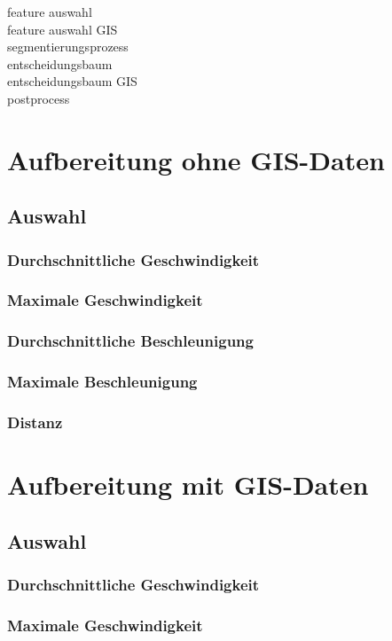 feature auswahl \\
feature auswahl GIS \\
segmentierungsprozess \\
entscheidungsbaum \\
entscheidungsbaum GIS \\
postprocess \\
\clearpage


\section{Aufbereitung ohne GIS-Daten}
\subsection{Auswahl}
\subsubsection{Durchschnittliche Geschwindigkeit}
\subsubsection{Maximale Geschwindigkeit}
\subsubsection{Durchschnittliche Beschleunigung}
\subsubsection{Maximale Beschleunigung}
\subsubsection{Distanz}
\clearpage

\section{Aufbereitung mit GIS-Daten}
\subsection{Auswahl}
\subsubsection{Durchschnittliche Geschwindigkeit}
\subsubsection{Maximale Geschwindigkeit}
